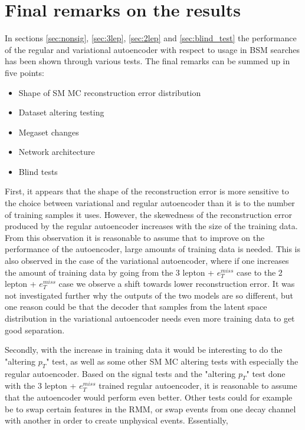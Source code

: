 \section{Final remarks on the results}
In sections \ref{sec:nonsig}, \ref{sec:3lep}, \ref{sec:2lep} and \ref{sec:blind_test} the performance 
of the regular and variational autoencoder with respect to usage in BSM 
searches has been shown through various tests. The final remarks can be summed 
up in five points:
\begin{itemize}
    
    \item Shape of SM MC reconstruction error distribution 
    \item Dataset altering testing
    \item Megaset changes 
    \item Network architecture
    \item Blind tests

\end{itemize}
First, it appears that the shape of the reconstruction error is more sensitive 
to the choice between variational and regular autoencoder than it is to the 
number of training samples it uses. However, the skewedness of the reconstruction error 
produced by the regular autoencoder increases with the size of the training data. 
From this observation it is reasonable to assume that to improve on the performance of 
the autoencoder, large amounts of training data is needed. This 
is also observed in the case of the variational autoencoder, where if one increases 
the amount of training data by going from the 3 lepton + $e_T^{miss}$ case to 
the 2 lepton + $e_T^{miss}$ case we observe a shift towards lower reconstruction error.
It was not investigated further why the outputs of the two models are so different, but one reason could be 
that the decoder that samples from the latent space distribution in the 
variational autoencoder needs even more training data to get good separation. \par 
Secondly, with the increase in training data it would be interesting to do the 
"altering $p_T$" test, as well as some other SM MC altering tests with especially the 
regular autoencoder. Based on the signal tests and the "altering $p_T$" test done with 
the 3 lepton + $e_T^{miss}$ trained regular autoencoder, it is reasonable to assume that the 
autoencoder would perform even better. Other tests could for example be to swap 
certain features in the RMM, or swap events from
one decay channel with another in order to create unphysical events. Essentially, 
